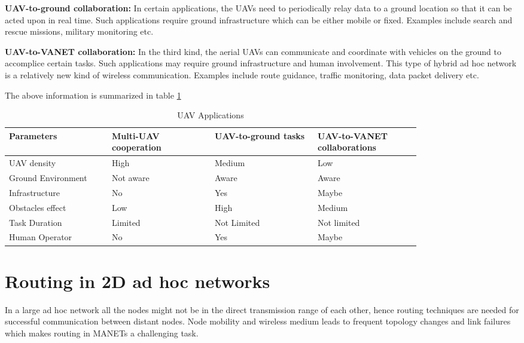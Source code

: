 \textbf{UAV-to-ground collaboration:} In certain applications, the UAVs need to periodically relay data to a ground location so that it can be acted upon in real time. Such applications require ground infrastructure which can be either mobile or fixed. Examples include search and rescue missions, military monitoring etc.

\textbf{UAV-to-VANET collaboration:} In the third kind, the aerial UAVs can communicate and coordinate with vehicles on the ground to accomplice certain tasks. Such applications may require ground infrastructure and human involvement. This type of hybrid ad hoc network is a relatively new kind of wireless communication. Examples include route guidance, traffic monitoring, data packet delivery etc.

The above information is summarized in table \ref{tab:uav_applications}

\begin{table}
\caption{UAV Applications}
\label{tab:uav_applications}
\begin{tabular}{|p{0.2\linewidth}|p{0.2\linewidth}|p{0.2\linewidth}|p{0.2\linewidth}|}
\toprule
Parameters & Multi-UAV cooperation & UAV-to-ground tasks & UAV-to-VANET collaborations\\
\midrule
UAV density & High & Medium & Low\\
\midrule
Ground Environment 	& Not aware &  Aware & Aware  \\
\midrule
Infrastructure & No & Yes &  Maybe \\
\midrule
Obstacles effect & Low & High & Medium \\
\midrule
Task Duration & Limited & Not Limited & Not limited \\
\midrule
Human Operator & No & Yes & Maybe \\
\bottomrule
\end{tabular}
\end{table}

\section{Routing in 2D ad hoc networks}

In a large ad hoc network all the nodes might not be in the direct transmission range of each other, hence routing techniques are needed for successful communication between distant nodes. Node mobility and wireless medium leads to frequent topology changes and link failures which makes routing in MANETs a challenging task.

